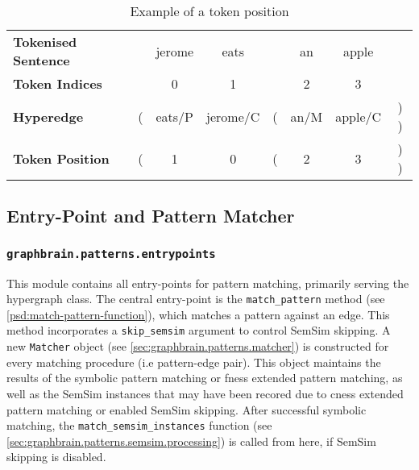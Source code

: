 \documentclass[11pt]{scrreprt}
\begin{document}
\begin{table}
\centering
\begin{tabular}{lccccccc}

\textbf{Tokenised Sentence} &	  & jerome & eats &  & an & apple & \\
\textbf{Token Indices} &	  & 0	& 1 & & 2 & 3 & \\

	  \midrule

\textbf{Hyperedge} &	  ( & \textsf{eats/P} & \textsf{jerome/C} & ( & \textsf{an/M}  & \textsf{apple/C} & ) ) \\
\textbf{Token Position} & 	  ( & 1 & 0 & ( & 2 & 3 & ) )
\end{tabular}	
\caption{Example of a token position}
\label{tab:example-token-position}
\end{table}

 
\subsection{Entry-Point and Pattern Matcher} 
 
\subsubsection{\texttt{graphbrain.patterns.entrypoints}}
\label{sec:graphbrain.patterns.entrypoints}
This module contains all entry-points for pattern matching, primarily serving the hypergraph class. The central entry-point is the \texttt{match\_pattern} method (see \cref{psd:match-pattern-function}), which matches a pattern against an edge. This method incorporates a \texttt{skip\_semsim} argument to control SemSim skipping. A new \texttt{Matcher} object (see \cref{sec:graphbrain.patterns.matcher}) is constructed for every matching procedure (i.e pattern-edge pair). This object maintains the results of the symbolic pattern matching or \gls{fness} extended pattern matching, as well as the SemSim instances that may have been recored due to \gls{cness} extended pattern matching or enabled SemSim skipping. After successful symbolic matching, the \texttt{match\_semsim\_instances} function (see \cref{sec:graphbrain.patterns.semsim.processing}) is called from here, if SemSim skipping is disabled. 

\end{document}

